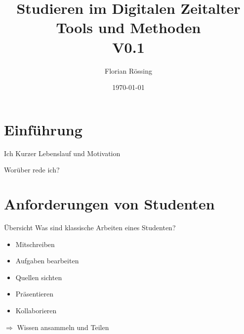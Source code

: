 \documentclass{beamer}
\title{Studieren im Digitalen Zeitalter \\\small Tools und Methoden\\ V0.1}
\author{Florian Rössing}
\date{\today}
\begin{document}
\maketitle

\section{Einführung}
\begin{frame}{Ich}
    Kurzer Lebenslauf und Motivation
\end{frame}

\begin{frame}{Worüber rede ich?}
\tableofcontents[sectionstyle=show,subsectionstyle=show/hide]
\end{frame}

\section{Anforderungen von Studenten}
\begin{frame}{Übersicht}
Was sind klassische Arbeiten eines Studenten?
    \begin{itemize}
        \item Mitschreiben
        \item Aufgaben bearbeiten
        \item Quellen sichten
        \item Präsentieren
        \item Kollaborieren        
    \end{itemize}
    $\Rightarrow$ Wissen ansammeln und Teilen
\end{frame}
\end{document}
